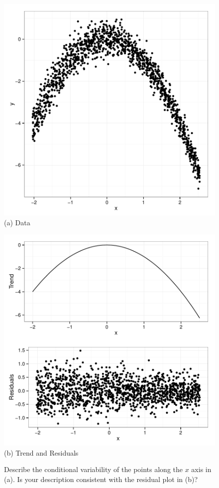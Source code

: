 \documentclass[11pt]{isuthesis}\usepackage[]{graphicx}\usepackage[]{color}
\begin{document}
\begin{figure} \hfill
\begin{minipage}[b]{.45\textwidth}
  \centering
  \includegraphics[width=\textwidth]{fig-cleveland1}\\
  (a) \small Data
\end{minipage} \hfill\hfill
\begin{minipage}[b]{.45\textwidth}
  \centering
  \includegraphics[width=\textwidth]{fig-cleveland2}\\
  (b) \small Trend and Residuals
\end{minipage} \hfill
\caption{Describe the conditional variability of the points along the $x$ axis in (a). Is your description consistent with the residual plot in (b)?}
\label{fig:cleveland-figure2}
\end{figure}
\end{document}
